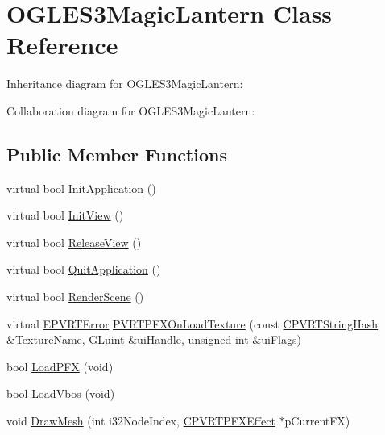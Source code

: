 \hypertarget{class_o_g_l_e_s3_magic_lantern}{\section{O\+G\+L\+E\+S3\+Magic\+Lantern Class Reference}
\label{class_o_g_l_e_s3_magic_lantern}
}


Inheritance diagram for O\+G\+L\+E\+S3\+Magic\+Lantern\+:


Collaboration diagram for O\+G\+L\+E\+S3\+Magic\+Lantern\+:
\subsection*{Public Member Functions}
\begin{DoxyCompactItemize}
\item 
virtual bool \hyperlink{class_o_g_l_e_s3_magic_lantern_aa5d61d3ff366e0f6805b347d6620c955}{Init\+Application} ()
\item 
virtual bool \hyperlink{class_o_g_l_e_s3_magic_lantern_a09dcab3677a281ee9fee65979df5a672}{Init\+View} ()
\item 
virtual bool \hyperlink{class_o_g_l_e_s3_magic_lantern_a99e71d7f7a01f5bea73b3baefb32fb9b}{Release\+View} ()
\item 
virtual bool \hyperlink{class_o_g_l_e_s3_magic_lantern_abcf4dd20b380e77bec2944a068660364}{Quit\+Application} ()
\item 
virtual bool \hyperlink{class_o_g_l_e_s3_magic_lantern_a60662b8c25d2b6f583b89676d628761c}{Render\+Scene} ()
\item 
virtual \hyperlink{_p_v_r_t_error_8h_a9e837ff1a83f3a5f332bc4cc78454608}{E\+P\+V\+R\+T\+Error} \hyperlink{class_o_g_l_e_s3_magic_lantern_a04772e79a905e4d11c59f3d69171097c}{P\+V\+R\+T\+P\+F\+X\+On\+Load\+Texture} (const \hyperlink{class_c_p_v_r_t_string_hash}{C\+P\+V\+R\+T\+String\+Hash} \&Texture\+Name, G\+Luint \&ui\+Handle, unsigned int \&ui\+Flags)
\item 
bool \hyperlink{class_o_g_l_e_s3_magic_lantern_ae82d496015780a26be25dfd77ef75a8e}{Load\+P\+F\+X} (void)
\item 
bool \hyperlink{class_o_g_l_e_s3_magic_lantern_abf040c19e9db0e64ce03adb9e432ce64}{Load\+Vbos} (void)
\item 
void \hyperlink{class_o_g_l_e_s3_magic_lantern_ac56e5e3d744ad0fb0687fe13291f219b}{Draw\+Mesh} (int i32\+Node\+Index, \hyperlink{class_c_p_v_r_t_p_f_x_effect}{C\+P\+V\+R\+T\+P\+F\+X\+Effect} $\ast$p\+Current\+F\+X)
\end{DoxyCompactItemize}


